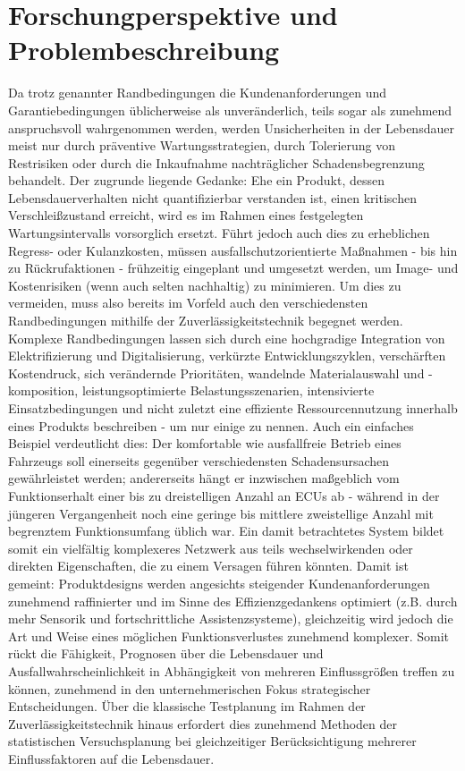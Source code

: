 \section{Forschungperspektive und Problembeschreibung}
Da trotz genannter Randbedingungen die Kundenanforderungen und Garantiebedingungen üblicherweise als unveränderlich, teils sogar als zunehmend anspruchsvoll wahrgenommen werden, werden Unsicherheiten in der Lebensdauer meist nur durch präventive Wartungsstrategien, durch Tolerierung von Restrisiken oder durch die Inkaufnahme nachträglicher Schadensbegrenzung behandelt.
Der zugrunde liegende Gedanke: Ehe ein Produkt, dessen Lebensdauerverhalten nicht quantifizierbar verstanden ist, einen kritischen Verschleißzustand erreicht, wird es im Rahmen eines festgelegten Wartungsintervalls vorsorglich ersetzt.
Führt jedoch auch dies zu erheblichen Regress- oder Kulanzkosten, müssen ausfallschutzorientierte Maßnahmen - bis hin zu Rückrufaktionen - frühzeitig eingeplant und umgesetzt werden, um Image- und Kostenrisiken (wenn auch selten nachhaltig) zu minimieren.
Um dies zu vermeiden, muss also bereits im Vorfeld auch den verschiedensten Randbedingungen mithilfe der Zuverlässigkeitstechnik begegnet werden.
Komplexe Randbedingungen lassen sich durch eine hochgradige Integration von Elektrifizierung und Digitalisierung, verkürzte Entwicklungszyklen, verschärften Kostendruck, sich verändernde Prioritäten, wandelnde Materialauswahl und -komposition, leistungsoptimierte Belastungsszenarien, intensivierte Einsatzbedingungen und nicht zuletzt eine effiziente Ressourcennutzung innerhalb eines Produkts beschreiben - um nur einige zu nennen.
Auch ein einfaches Beispiel verdeutlicht dies: Der komfortable wie ausfallfreie Betrieb eines Fahrzeugs soll einerseits gegenüber verschiedensten Schadensursachen gewährleistet werden; andererseits hängt er inzwischen maßgeblich vom Funktionserhalt einer bis zu dreistelligen Anzahl an ECUs ab - während in der jüngeren Vergangenheit noch eine geringe bis mittlere zweistellige Anzahl mit begrenztem Funktionsumfang üblich war.
Ein damit betrachtetes System bildet somit ein vielfältig komplexeres Netzwerk aus teils wechselwirkenden oder direkten Eigenschaften, die zu einem Versagen führen könnten.
Damit ist gemeint: Produktdesigns werden angesichts steigender Kundenanforderungen zunehmend raffinierter und im Sinne des Effizienzgedankens optimiert (z.B. durch mehr Sensorik und fortschrittliche Assistenzsysteme), gleichzeitig wird jedoch die Art und Weise eines möglichen Funktionsverlustes zunehmend komplexer.
Somit rückt die Fähigkeit, Prognosen über die Lebensdauer und Ausfallwahrscheinlichkeit in Abhängigkeit von mehreren Einflussgrößen treffen zu können, zunehmend in den unternehmerischen Fokus strategischer Entscheidungen.
Über die klassische Testplanung im Rahmen der Zuverlässigkeitstechnik hinaus erfordert dies zunehmend Methoden der statistischen Versuchsplanung bei gleichzeitiger Berücksichtigung mehrerer Einflussfaktoren auf die Lebensdauer.

